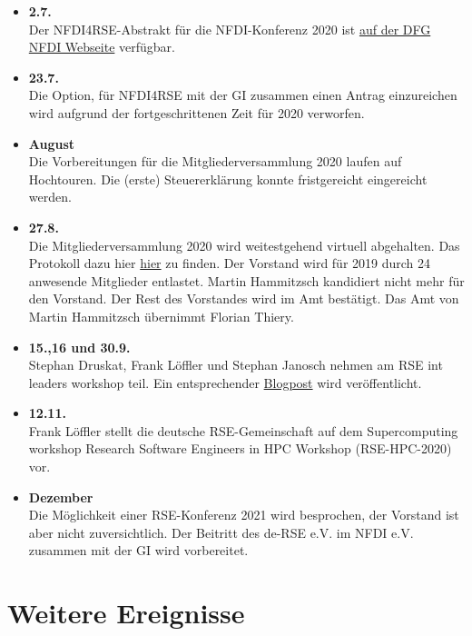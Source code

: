 \begin{itemize}
 \item \textbf{2.7.}\\Der NFDI4RSE-Abstrakt für die NFDI-Konferenz 2020 ist \href{https://www.dfg.de/download/pdf/foerderung/programme/nfdi/nfdi_konferenz_2020/nfdi4rse_abstract.pdf}{auf der DFG NFDI Webseite} verfügbar.
 \item \textbf{23.7.}\\Die Option, für NFDI4RSE mit der GI zusammen einen Antrag einzureichen wird aufgrund der fortgeschrittenen Zeit für 2020 verworfen.
 \item \textbf{August}\\Die Vorbereitungen für die Mitgliederversammlung 2020 laufen auf Hochtouren. Die (erste) Steuererklärung konnte fristgereicht eingereicht werden.
 \item \textbf{27.8.}\\Die Mitgliederversammlung 2020 wird weitestgehend virtuell abgehalten. Das Protokoll dazu hier \href{https://github.com/DE-RSE/protokolle/blob/master/Mitgliederversammlungen/MV-deRSE-2020-08-27-V1.md}{hier} zu finden. Der Vorstand wird für 2019 durch 24 anwesende Mitglieder entlastet. Martin Hammitzsch kandidiert nicht mehr für den Vorstand. Der Rest des Vorstandes wird im Amt bestätigt. Das Amt von Martin Hammitzsch übernimmt Florian Thiery.
 \item \textbf{15.,16 und 30.9.}\\Stephan Druskat, Frank Löffler und Stephan Janosch nehmen am RSE int leaders workshop teil. Ein entsprechender \href{https://researchsoftware.org/2020/10/09/2nd-international-rse-leaders-workshop.html}{Blogpost} wird veröffentlicht.
 \item \textbf{12.11.}\\Frank Löffler stellt die deutsche RSE-Gemeinschaft auf dem Supercomputing workshop Research Software Engineers in HPC Workshop (RSE-HPC-2020) vor.
 \item \textbf{Dezember}\\Die Möglichkeit einer RSE-Konferenz 2021 wird besprochen, der Vorstand ist aber nicht zuversichtlich. Der Beitritt des de-RSE e.V. im NFDI e.V. zusammen mit der GI wird vorbereitet.
\end{itemize}

\section{Weitere Ereignisse}

